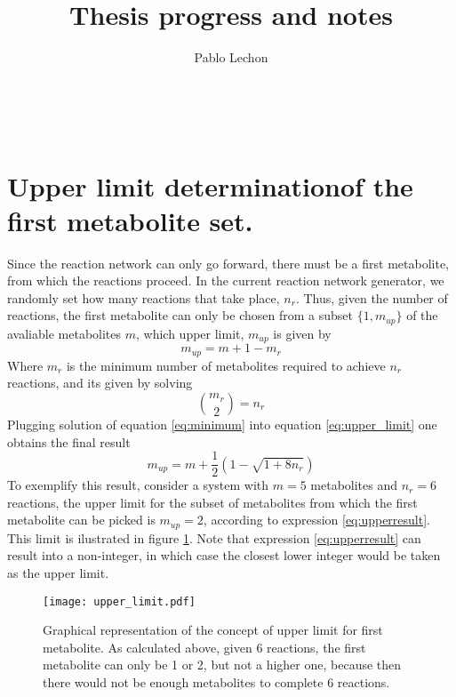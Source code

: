 \documentclass[12pt]{article}
\title{Thesis progress and notes}
\author{Pablo Lechon}
\begin{document}
	\maketitle
	\newpage\
	\section{Upper limit determinationof the  first metabolite set.}
	Since the reaction network can only go forward, there must be a first metabolite, from which the reactions proceed. In the current reaction network generator, we randomly set how many reactions that take place, $ n_r $. Thus, given the number of reactions, the first metabolite can only be chosen from a subset $ \{1,m_{up}\} $ of the avaliable metabolites $ m $,  which upper limit, $ m_{up} $ is given by 
	\begin{equation}
		\label{eq:upper_limit}
		m_{up} = m + 1 - m_r
	\end{equation}
	Where $ m_r $ is the minimum number of metabolites required to achieve $ n_r $ reactions, and its given by solving
	\begin{equation}
		{m_{r} \choose 2} = n_r
		\label{eq:minimum}
	\end{equation}
	Plugging solution of equation \ref{eq:minimum} into equation \ref{eq:upper_limit} one obtains the final result
	\begin{equation}
		m_{up} = m + \frac 1 2 \left(1 - \sqrt{1 + 8n_r}\right)
		\label{eq:upperresult}
	\end{equation}
	To exemplify this result, consider a system with $ m = 5 $ metabolites and  $ n_r =  6 $ reactions, the upper limit for the subset of metabolites from which the first metabolite can be picked is $ m_{up} = 2 $, according to expression \ref{eq:upperresult}. This limit is ilustrated in figure \ref{fig:example_upper}. Note that expression \ref{eq:upperresult} can result into a non-integer, in which case the closest lower integer would be taken as the upper limit. 
	\begin{figure}[h]
		\centering
		\texttt{[image: upper\_limit.pdf]}
		\caption{Graphical representation of the concept of upper limit for first metabolite. As calculated above, given 6 reactions, the first metabolite can only be 1 or 2, but not a higher one, because then there would not be enough metabolites to complete 6 reactions.}
		\label{fig:example_upper}
	\end{figure}
\end{document}
